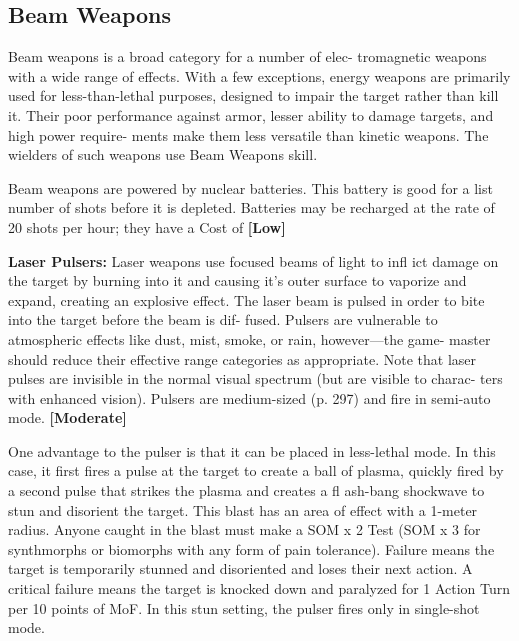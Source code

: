\subsection{Beam Weapons}

Beam weapons is a broad category for a number of elec-
tromagnetic weapons with a wide range of effects. With 
a few exceptions, energy weapons are primarily used for 
less-than-lethal purposes, designed to impair the target 
rather than kill it. Their poor performance against armor, 
lesser ability to damage targets, and high power require-
ments make them less versatile than kinetic weapons. 
The wielders of such weapons use Beam Weapons skill.

Beam weapons are powered by nuclear batteries. 
This battery is good for a list number of shots before 
it is depleted. Batteries may be recharged at the rate of 
20 shots per hour; they have a Cost of \textbf{[Low]}

\textbf{Laser Pulsers: }Laser weapons use focused beams of 
light to infl ict damage on the target by burning into it 
and causing it's outer surface to vaporize and expand, 
creating an explosive effect. The laser beam is pulsed 
in order to bite into the target before the beam is dif-
fused. Pulsers are vulnerable to atmospheric effects 
like dust, mist, smoke, or rain, however—the game-
master should reduce their effective range categories 
as appropriate. Note that laser pulses are invisible in 
the normal visual spectrum (but are visible to charac-
ters with enhanced vision). Pulsers are medium-sized 
(p. 297) and fire in semi-auto mode. \textbf{[Moderate]}

One advantage to the pulser is that it can be placed 
in less-lethal mode. In this case, it first fires a pulse at 
the target to create a ball of plasma, quickly fired by 
a second pulse that strikes the plasma and creates a 
fl ash-bang shockwave to stun and disorient the target. 
This blast has an area of effect with a 1-meter radius. 
Anyone caught in the blast must make a SOM x 2 
Test (SOM x 3 for synthmorphs or biomorphs with 
any form of pain tolerance). Failure means the target 
is temporarily stunned and disoriented and loses 
their next action. A critical failure means the target 
is knocked down and paralyzed for 1 Action Turn per 
10 points of MoF. In this stun setting, the pulser fires 
only in single-shot mode.

